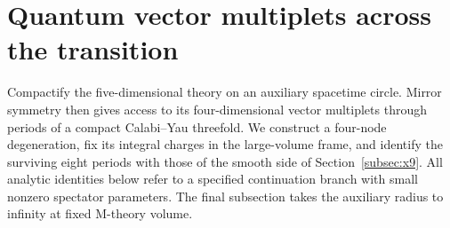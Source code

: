 \section{Quantum vector multiplets across the transition}
\label{sec:quantum}

Compactify the five-dimensional theory on an auxiliary spacetime
circle. Mirror symmetry then gives access to its four-dimensional
vector multiplets through periods of a compact Calabi--Yau threefold.
We construct a four-node degeneration, fix its integral charges in
the large-volume frame, and identify the surviving eight periods
with those of the smooth side of Section~\ref{subsec:x9}.
All analytic identities below refer to a specified continuation
branch with small nonzero spectator parameters. The final subsection
takes the auxiliary radius to infinity at fixed M-theory volume.






